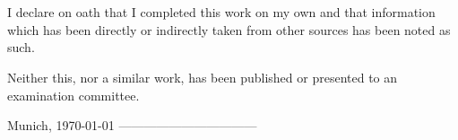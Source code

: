 \documentclass[document.tex]{subfiles}
\begin{document}
\clearpage\thispagestyle{empty}
\section*{\statutorytitle}
I declare on oath that I completed this work on my own and that information which has been directly or indirectly taken from other sources has been noted as such.
 
Neither this, nor a similar work, has been published or presented to an examination committee. 
 
Munich, \today
\newline
\newline
\newline
\newline
\newline
---------------------------------\newline
\makeatletter \@author
\end{document}
